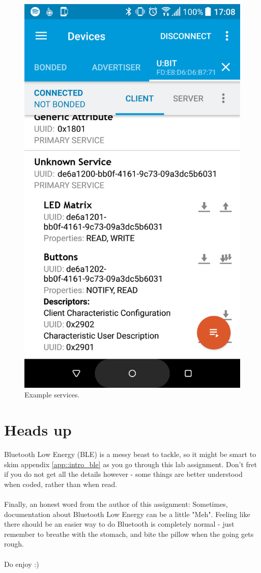 \documentclass[11pt,a4paper]{article}
\begin{document}
\begin{figure}[ht]
\begin{minipage}{0.5\linewidth}
\includegraphics[width=0.9\linewidth]{example_connect_gatt.png}
\caption{Example services.}
\label{fig::example_services}
\end{minipage}
\end{figure}

\newpage
\noindent
\setcounter{section}{0}
\renewcommand{\thesection}{\arabic{section}}
\renewcommand{\thesubsection}{\arabic{section}.\arabic{subsection}}

\section{Heads up}
Bluetooth Low Energy (BLE) is a messy beast to tackle, so it might be smart to skim appendix \ref{app::intro_ble} as you go through this lab assignment. Don't fret if you do not get all the details however - some things are better understood when coded, rather than when read.\\
\\
Finally, an honest word from the author of this assignment: Sometimes, documentation about Bluetooth Low Energy can be a little "Meh". Feeling like there should be an easier way to do Bluetooth is completely normal - just remember to breathe with the stomach, and bite the pillow when the going gets rough.\\
\\
Do enjoy :)
\end{document}
